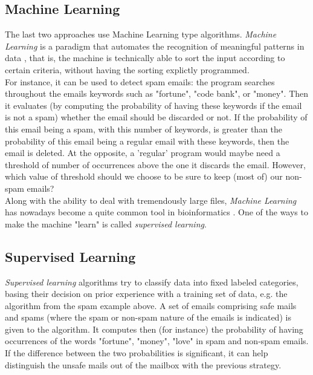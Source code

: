 \documentclass{report}
\begin{document}
\subsection{Machine Learning}

The last two approaches use Machine Learning type algorithms. \emph{Machine Learning} is a paradigm that automates the recognition of meaningful patterns in data \cite{SSS}, that is, the machine is technically able to sort the input according to certain criteria, without having the sorting explictly programmed.\\

For instance, it can be used to detect spam emails: the program searches throughout the emails keywords such as "fortune", "code bank", or "money". Then it evaluates (by computing the probability of having these keywords if the email is not a spam) whether the email should be discarded or not. If the probability of this email being a spam, with this number of keywords, is greater than the probability of this email being a regular email with these keywords, then the email is deleted. At the opposite, a 'regular' program would maybe need a threshold of number of occurrences above the one it discards the email. However, which value of threshold should we choose to be sure to keep (most of) our non-spam emails?\\

Along with the ability to deal with tremendously large files, \emph{Machine Learning} has nowadays become a quite common tool in bioinformatics \cite{Nikolski}. One of the ways to make the machine "learn" is called \emph{supervised learning}. 

\subsection{Supervised Learning}

\emph{Supervised learning} algorithms try to classify data into fixed labeled categories, basing their decision on prior experience with a training set of data, e.g. the algorithm from the spam example above. A set of emails comprising safe mails and spams (where the spam or non-spam nature of the emails is indicated) is given to the algorithm. It computes then (for instance) the probability of having occurrences of the words "fortune", "money", "love" in spam and non-spam emails. If the difference between the two probabilities is significant, it can help distinguish the unsafe mails out of the mailbox with the previous strategy.\\
\end{document}
